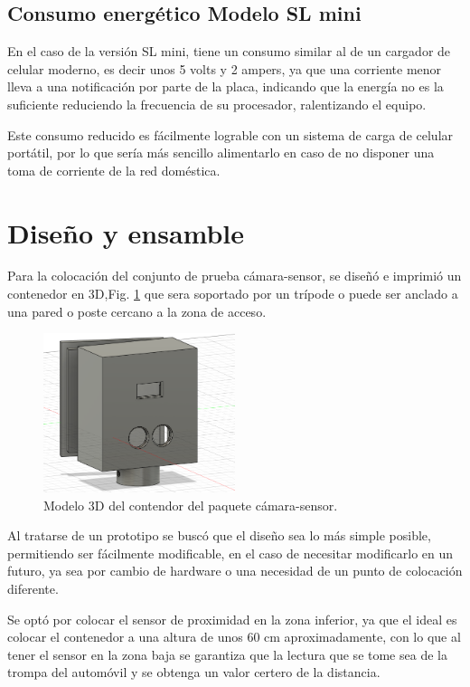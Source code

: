 \subsection{Consumo energético Modelo SL mini}

En el caso de la versión SL mini, tiene un consumo similar al de un cargador de celular moderno, es decir unos 5 volts y
2 ampers, ya que una corriente menor lleva a una notificación por parte de la placa, indicando que la energía no es la 
suficiente reduciendo la frecuencia de su procesador, ralentizando el equipo.

Este consumo reducido es fácilmente lograble con un sistema de carga de celular portátil, por lo que sería más sencillo 
alimentarlo en caso de no disponer una toma de corriente de la red doméstica.

\section{Diseño y ensamble}

Para la colocación del conjunto de prueba cámara-sensor, se diseñó e imprimió un contenedor en 3D,Fig. \ref{fig:contenedor-camara}
que sera soportado por un trípode o puede ser anclado a una pared o poste cercano a la zona de acceso.
\begin{figure}
    \centering
    \includegraphics[width=0.5\textwidth]{imgs/contenedor-camara.png}
    \caption{Modelo 3D del contendor del paquete cámara-sensor.}
    \label{fig:contenedor-camara}
\end{figure}

Al tratarse de un prototipo se buscó que el diseño sea lo más simple posible, permitiendo ser fácilmente modificable, en el caso de necesitar
modificarlo en un futuro, ya sea por cambio de hardware o una necesidad de un punto de colocación diferente.

Se optó por colocar el sensor de proximidad en la zona inferior, ya que el ideal es colocar el contenedor a una altura de unos 60 cm 
aproximadamente, con lo que al tener el sensor en la zona baja se garantiza que la lectura que se tome sea de la trompa del automóvil y se 
obtenga un valor certero de la distancia.

